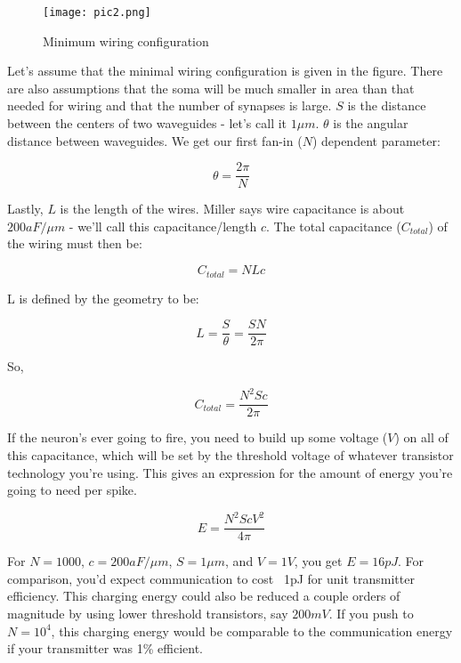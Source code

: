 \documentclass{article}
\begin{document}
\begin{figure}[htb]
\begin{center}
   \texttt{[image: pic2.png]}
   \caption{Minimum wiring configuration}
\end{center}
\end{figure}

Let's assume that the minimal wiring configuration is given in the figure. There are also assumptions that the soma will be much smaller in area than that needed for wiring and that the number of synapses is large. $S$ is the distance between the centers of two waveguides - let's call it $1 \mu m$. $\theta$ is the angular distance between waveguides. We get our first fan-in ($N$) dependent parameter: 

\begin{equation}
    \theta = \frac{2\pi}{N}
\end{equation}

Lastly, $L$ is the length of the wires. Miller says wire capacitance is about $200 aF/\mu m$ - we'll call this capacitance/length $c$. The total capacitance ($C_{total}$) of the wiring must then be:

\begin{equation}
    C_{total} = NLc
\end{equation}

L is defined by the geometry to be:

\begin{equation}
    L = \frac{S}{\theta} = \frac{SN}{2\pi}
\end{equation}

So,

\begin{equation}
    C_{total} = \frac{N^{2}Sc}{2\pi}
\end{equation}


If the neuron's ever going to fire, you need to build up some voltage ($V$) on all of this capacitance, which will be set by the threshold voltage of whatever transistor technology you're using. This gives an expression for the  amount of energy you're going to need per spike.

\begin{equation}
    E = \frac{N^{2}ScV^{2}}{4\pi}
\end{equation}

For $N=1000$, $c = 200aF/\mu m$, $S=1\mu m$, and $V=1V$, you get $E = 16pJ$. For comparison, you'd expect communication to cost ~1pJ for unit transmitter efficiency. This charging energy could also be reduced a couple orders of magnitude by using lower threshold transistors, say $200 mV$. If you push to $N=10^{4}$, this charging energy would be comparable to the communication energy if your transmitter was 1\% efficient.
\end{document}
